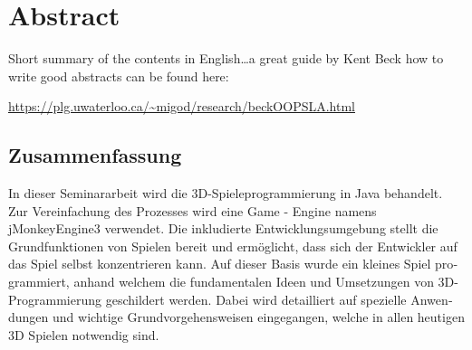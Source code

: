 \begingroup
\let\clearpage\relax
\let\cleardoublepage\relax
\let\cleardoublepage\relax


\ifx\myLanguage\english

\chapter*{Abstract}
Short summary of the contents in English\dots a great guide by 
Kent Beck how to write good abstracts can be found here:  
\begin{center}
\url{https://plg.uwaterloo.ca/~migod/research/beckOOPSLA.html}
\end{center}

\vfill

\fi

\begin{otherlanguage}{ngerman}
\chapter*{Zusammenfassung}
In dieser Seminararbeit wird die 3D-Spieleprogrammierung in Java behandelt. Zur Vereinfachung des Prozesses wird eine Game - Engine namens jMonkeyEngine3 verwendet. Die inkludierte Entwicklungsumgebung stellt die Grundfunktionen von Spielen bereit und ermöglicht, dass sich der Entwickler auf das Spiel selbst konzentrieren kann.
Auf dieser Basis wurde ein kleines Spiel programmiert, anhand welchem die fundamentalen Ideen und Umsetzungen von 3D-Programmierung geschildert werden. Dabei wird detailliert auf spezielle Anwendungen und wichtige Grundvorgehensweisen eingegangen, welche in allen heutigen 3D Spielen notwendig sind.

	
\end{otherlanguage}

\endgroup			

\vfill